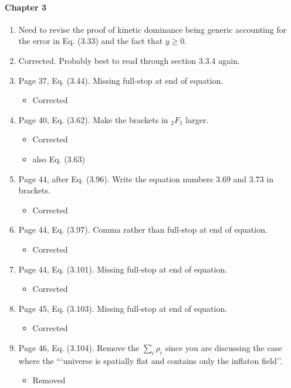 \documentclass[11pt]{article}
\begin{document}
\paragraph{Chapter 3}
\begin{enumerate}
\item Need to revise the proof of kinetic dominance being generic
  accounting for the error in Eq. (3.33) and the fact that $y\geq 0$.
  \item Corrected. Probably best to read through section 3.3.4 again.
\item Page 37, Eq. (3.44). Missing full-stop at end of equation.
  \begin{itemize}
    \item Corrected
  \end{itemize}
\item Page 40, Eq. (3.62). Make the brackets in ${}_2 F_1$ larger.
  \begin{itemize}
    \item Corrected
    \item also Eq. (3.63)
  \end{itemize}
\item Page 44, after Eq. (3.96). Write the equation numbers 3.69 and
  3.73 in brackets.
  \begin{itemize}
    \item Corrected
  \end{itemize}
\item Page 44, Eq. (3.97). Comma rather than full-stop at end of
  equation.
  \begin{itemize}
    \item Corrected
  \end{itemize}
\item Page 44, Eq. (3.101). Missing full-stop at end of equation.
  \begin{itemize}
    \item Corrected
  \end{itemize}
\item Page 45, Eq. (3.103). Missing full-stop at end of equation.
  \begin{itemize}
    \item Corrected
  \end{itemize}
\item Page 46, Eq. (3.104). Remove the $\sum_i \rho_i$ since you are
  discussing the case where the ```universe is spatially flat and
  contains only the inflaton field''.
  \begin{itemize}
    \item Removed

\end{itemize}
\end{enumerate}
\end{document}
